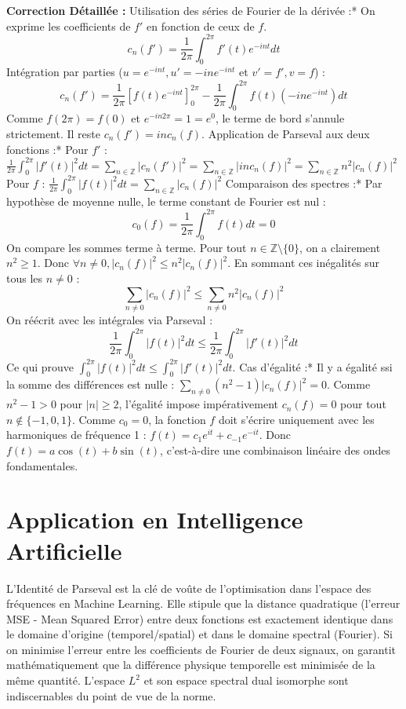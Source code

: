 \documentclass[11pt,a4paper]{article}
\begin{document}
\textbf{Correction Détaillée :}
\textit{ }Utilisation des séries de Fourier de la dérivée :*
  On exprime les coefficients de $f'$ en fonction de ceux de $f$.
  $$c_n(f') = \frac{1}{2\pi} \int_0^{2\pi} f'(t) e^{-int} dt$$
  Intégration par parties ($u = e^{-int}, u' = -in e^{-int}$ et $v' = f', v = f$) :
  $$c_n(f') = \frac{1}{2\pi} \left[ f(t) e^{-int} \right]_0^{2\pi} - \frac{1}{2\pi} \int_0^{2\pi} f(t) (-in e^{-int}) dt$$
  Comme $f(2\pi) = f(0)$ et $e^{-i n 2\pi} = 1 = e^0$, le terme de bord s'annule strictement.
  Il reste $c_n(f') = in c_n(f)$.
\textit{ }Application de Parseval aux deux fonctions :*
  Pour $f'$ : $\frac{1}{2\pi} \int_0^{2\pi} |f'(t)|^2 dt = \sum_{n \in \mathbb{Z}} |c_n(f')|^2 = \sum_{n \in \mathbb{Z}} |in c_n(f)|^2 = \sum_{n \in \mathbb{Z}} n^2 |c_n(f)|^2$
  Pour $f$ : $\frac{1}{2\pi} \int_0^{2\pi} |f(t)|^2 dt = \sum_{n \in \mathbb{Z}} |c_n(f)|^2$
\textit{ }Comparaison des spectres :*
  Par hypothèse de moyenne nulle, le terme constant de Fourier est nul :
  $$c_0(f) = \frac{1}{2\pi} \int_0^{2\pi} f(t) dt = 0$$
  On compare les sommes terme à terme. Pour tout $n \in \mathbb{Z} \setminus \{0\}$, on a clairement $n^2 \ge 1$.
  Donc $\forall n \neq 0, |c_n(f)|^2 \le n^2 |c_n(f)|^2$.
  En sommant ces inégalités sur tous les $n \neq 0$ :
  $$\sum_{n \neq 0} |c_n(f)|^2 \le \sum_{n \neq 0} n^2 |c_n(f)|^2$$
  On réécrit avec les intégrales via Parseval :
  $$\frac{1}{2\pi} \int_0^{2\pi} |f(t)|^2 dt \le \frac{1}{2\pi} \int_0^{2\pi} |f'(t)|^2 dt$$
  Ce qui prouve $\int_0^{2\pi} |f(t)|^2 dt \le \int_0^{2\pi} |f'(t)|^2 dt$.
\textit{ }Cas d'égalité :*
  Il y a égalité ssi la somme des différences est nulle : $\sum_{n \neq 0} (n^2 - 1) |c_n(f)|^2 = 0$.
  Comme $n^2 - 1 > 0$ pour $|n| \ge 2$, l'égalité impose impérativement $c_n(f) = 0$ pour tout $n \notin \{-1, 0, 1\}$.
  Comme $c_0 = 0$, la fonction $f$ doit s'écrire uniquement avec les harmoniques de fréquence 1 : $f(t) = c_1 e^{it} + c_{-1} e^{-it}$.
  Donc $f(t) = a \cos(t) + b \sin(t)$, c'est-à-dire une combinaison linéaire des ondes fondamentales.


\section{Application en Intelligence Artificielle}


L'Identité de Parseval est la clé de voûte de l'optimisation dans l'espace des fréquences en Machine Learning. Elle stipule que la distance quadratique (l'erreur MSE - Mean Squared Error) entre deux fonctions est exactement identique dans le domaine d'origine (temporel/spatial) et dans le domaine spectral (Fourier). Si on minimise l'erreur entre les coefficients de Fourier de deux signaux, on garantit mathématiquement que la différence physique temporelle est minimisée de la même quantité. L'espace $L^2$ et son espace spectral dual isomorphe sont indiscernables du point de vue de la norme.
\end{document}
